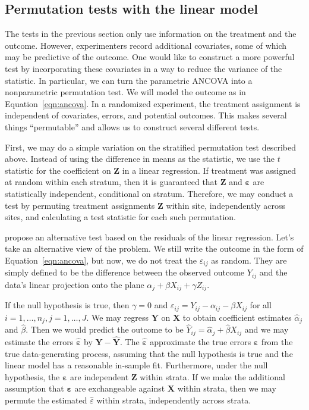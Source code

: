 \documentclass[11pt]{article}
\begin{document}
\subsection{Permutation tests with the linear model}
The tests in the previous section only use information on the treatment and the outcome.
However, experimenters record additional covariates, some of which may be predictive of the outcome.
One would like to construct a more powerful test by incorporating these covariates in a way to reduce the variance of the statistic.
In particular, we can turn the parametric ANCOVA into a nonparametric permutation test.
We will model the outcome as in Equation~\ref{eqn:ancova}.
In a randomized experiment, the treatment assignment is independent of covariates, errors, and potential outcomes.
This makes several things ``permutable'' and allows us to construct several different tests.

First, we may do a simple variation on the stratified permutation test described above.
Instead of using the difference in means as the statistic, we use the $t$ statistic for the coefficient on $\mathbf{Z}$ in a linear regression.
If treatment was assigned at random within each stratum, then it is guaranteed that $\mathbf{Z}$ and $\mathbf{\varepsilon}$ are statistically independent, conditional on stratum.
Therefore, we may conduct a test by permuting treatment assignments $\mathbf{Z}$ within site, independently across sites, and calculating a test statistic for each such permutation.

\citet{freedman_nonstochastic_1983} propose an alternative test based on the residuals of the linear regression.
Let's take an alternative view of the problem.
We still write the outcome in the form of Equation~\ref{eqn:ancova}, but now, we do not treat the $\varepsilon_{ij}$ as random.
They are simply defined to be the difference between the observed outcome $Y_{ij}$ and the data's linear projection onto the plane $\alpha_j + \beta X_{ij}+ \gamma Z_{ij}$.

If the null hypothesis is true, then $\gamma = 0$ and $\varepsilon_{ij} = Y_{ij} - \alpha_{ij} - \beta X_{ij}$ for all $i = 1, \dots, n_j, j = 1, \dots, J$.
We may regress $\mathbf{Y}$ on $\mathbf{X}$ to obtain coefficient estimates $\hat{\alpha}_j$ and $\hat{\beta}$.
Then we would predict the outcome to be $\hat{Y}_{ij} = \hat{\alpha}_j + \hat{\beta}X_{ij}$
and we may estimate the errors $\mathbf{\hat{\varepsilon}}$ by $\mathbf{Y} - \mathbf{\hat{Y}}$.
The $\mathbf{\hat{\varepsilon}}$ approximate the true errors $\mathbf{\varepsilon}$ from the true data-generating process, assuming that the null hypothesis is true and the linear model has a reasonable in-sample fit.
Furthermore, under the null hypothesis, the $\mathbf{\varepsilon}$ are independent $\mathbf{Z}$ within strata. 
If we make the additional assumption that $\mathbf{\varepsilon}$ are exchangeable against $\mathbf{X}$ within strata, then 
we may permute the estimated $\hat{\varepsilon}$ within strata, independently across strata.
\end{document}
